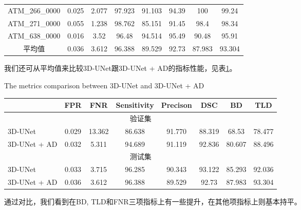 \begin{table}[!htb]
\begin{tabular}{cccccccc}
        ATM\_266\_0000 & 0.025 & 2.077  & 97.923 & 91.103 & 94.39  & 100     & 99.24  \\
        ATM\_271\_0000 & 0.055 & 1.238  & 98.762 & 85.151 & 91.45  & 98.4    & 98.34  \\
        ATM\_638\_0000 & 0.016 & 3.52   & 96.48  & 94.514 & 95.49  & 90.48   & 95.91  \\
        \midrule
        平均值 & 0.036 & 3.612 & 96.388 & 89.529 & 92.73 & 87.983 & 93.304  \\
        \bottomrule
    \end{tabular}
\end{table}

我们还可从平均值来比较3D-UNet跟3D-UNet + AD的指标性能，见表\ref{tbl:metrics_comparison}。
\begin{table}[!htp]
    \centering
        {The metrics comparison between 3D-UNet and 3D-UNet + AD}
    \label{tbl:metrics_comparison}
    \begin{tabular}{lccccccc}
        \toprule
                & FPR & FNR & Sensitivity & Precison & DSC & BD & TLD \\
        \midrule
        \multicolumn{8}{c}{验证集} \\
        3D-UNet & 0.029 & 13.362 & 86.638 & 91.770 & 88.319 & 68.53 & 78.477 \\
        3D-UNet + AD & 0.032 & 5.311 & 94.689 & 91.119 & 92.836 & 80.607 & 88.496 \\
        \midrule
        \multicolumn{8}{c}{测试集} \\
        3D-UNet & 0.033 & 3.715 & 96.285 & 90.343 & 93.122 & 85.293 & 92.036 \\
        3D-UNet + AD & 0.036 & 3.612 & 96.388 & 89.529 & 92.73 & 87.983 & 93.304  \\
        \bottomrule
    \end{tabular}
\end{table}
通过对比，我们看到在BD, TLD和FNR三项指标上有一些提升，在其他项指标上则基本持平。


